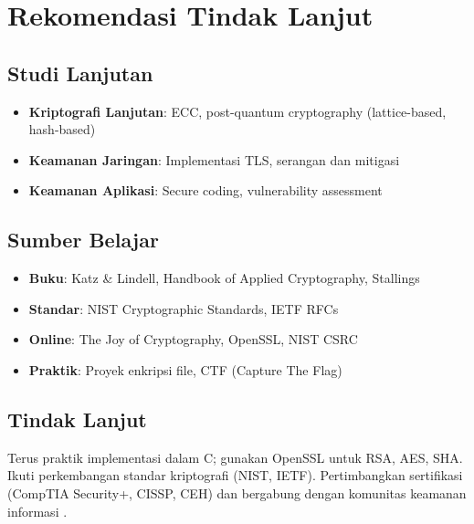 \section{Rekomendasi Tindak Lanjut}

\subsection{Studi Lanjutan}

\begin{itemize}
  \item \textbf{Kriptografi Lanjutan}: ECC, post-quantum cryptography (lattice-based, hash-based)
  \item \textbf{Keamanan Jaringan}: Implementasi TLS, serangan dan mitigasi
  \item \textbf{Keamanan Aplikasi}: Secure coding, vulnerability assessment
\end{itemize}

\subsection{Sumber Belajar}

\begin{itemize}
  \item \textbf{Buku}: Katz \& Lindell, Handbook of Applied Cryptography, Stallings
  \item \textbf{Standar}: NIST Cryptographic Standards, IETF RFCs
  \item \textbf{Online}: The Joy of Cryptography, OpenSSL, NIST CSRC
  \item \textbf{Praktik}: Proyek enkripsi file, CTF (Capture The Flag)
\end{itemize}

\subsection{Tindak Lanjut}

Terus praktik implementasi dalam C; gunakan OpenSSL untuk RSA, AES, SHA. Ikuti perkembangan standar kriptografi (NIST, IETF). Pertimbangkan sertifikasi (CompTIA Security+, CISSP, CEH) dan bergabung dengan komunitas keamanan informasi \cite{stallings2017}.

